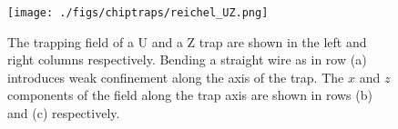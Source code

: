 \begin{figure}
  \centering
  \texttt{[image: ./figs/chiptraps/reichel\_UZ.png]}
  \caption{
  The trapping field of a U and a Z trap are shown in the left and right
  columns respectively. Bending a straight wire as in row (a) introduces weak
  confinement along the axis of the trap.  The $x$ and $z$ components of the
  field along the trap axis are shown in rows (b) and (c) respectively.
  }
  \label{intro:fig:reichel_UZ}
\end{figure}
